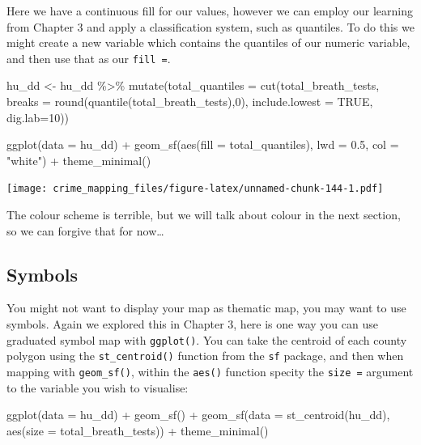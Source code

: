 \documentclass[
]{book}
\newenvironment{Shaded}{\begin{snugshade}}{\end{snugshade}}
\newcommand{\AttributeTok}[1]{\textcolor[rgb]{0.77,0.63,0.00}{#1}}
\newcommand{\ConstantTok}[1]{\textcolor[rgb]{0.00,0.00,0.00}{#1}}
\newcommand{\DecValTok}[1]{\textcolor[rgb]{0.00,0.00,0.81}{#1}}
\newcommand{\FloatTok}[1]{\textcolor[rgb]{0.00,0.00,0.81}{#1}}
\newcommand{\FunctionTok}[1]{\textcolor[rgb]{0.00,0.00,0.00}{#1}}
\newcommand{\NormalTok}[1]{#1}
\newcommand{\OtherTok}[1]{\textcolor[rgb]{0.56,0.35,0.01}{#1}}
\newcommand{\SpecialCharTok}[1]{\textcolor[rgb]{0.00,0.00,0.00}{#1}}
\newcommand{\StringTok}[1]{\textcolor[rgb]{0.31,0.60,0.02}{#1}}
\begin{document}
Here we have a continuous fill for our values, however we can employ our learning from Chapter 3 and apply a classification system, such as quantiles. To do this we might create a new variable which contains the quantiles of our numeric variable, and then use that as our \texttt{fill\ =}.

\begin{Shaded}
\begin{Highlighting}[]
\NormalTok{hu\_dd }\OtherTok{\textless{}{-}}\NormalTok{ hu\_dd }\SpecialCharTok{\%\textgreater{}\%} 
  \FunctionTok{mutate}\NormalTok{(}\AttributeTok{total\_quantiles =} \FunctionTok{cut}\NormalTok{(total\_breath\_tests, }\AttributeTok{breaks =} \FunctionTok{round}\NormalTok{(}\FunctionTok{quantile}\NormalTok{(total\_breath\_tests),}\DecValTok{0}\NormalTok{), }\AttributeTok{include.lowest =} \ConstantTok{TRUE}\NormalTok{, }\AttributeTok{dig.lab=}\DecValTok{10}\NormalTok{))}


\FunctionTok{ggplot}\NormalTok{(}\AttributeTok{data =}\NormalTok{ hu\_dd) }\SpecialCharTok{+} 
  \FunctionTok{geom\_sf}\NormalTok{(}\FunctionTok{aes}\NormalTok{(}\AttributeTok{fill =}\NormalTok{ total\_quantiles), }\AttributeTok{lwd =} \FloatTok{0.5}\NormalTok{, }\AttributeTok{col =} \StringTok{"white"}\NormalTok{) }\SpecialCharTok{+} 
  \FunctionTok{theme\_minimal}\NormalTok{()}
\end{Highlighting}
\end{Shaded}

\texttt{[image: crime\_mapping\_files/figure-latex/unnamed-chunk-144-1.pdf]}

The colour scheme is terrible, but we will talk about colour in the next section, so we can forgive that for now\ldots{}

\hypertarget{symbols}{%
\subsection{Symbols}\label{symbols}}

You might not want to display your map as thematic map, you may want to use symbols. Again we explored this in Chapter 3, here is one way you can use graduated symbol map with \texttt{ggplot()}. You can take the centroid of each county polygon using the \texttt{st\_centroid()} function from the \texttt{sf} package, and then when mapping with \texttt{geom\_sf()}, within the \texttt{aes()} function specity the \texttt{size\ =} argument to the variable you wish to visualise:

\begin{Shaded}
\begin{Highlighting}[]
\FunctionTok{ggplot}\NormalTok{(}\AttributeTok{data =}\NormalTok{ hu\_dd) }\SpecialCharTok{+} 
  \FunctionTok{geom\_sf}\NormalTok{() }\SpecialCharTok{+} 
  \FunctionTok{geom\_sf}\NormalTok{(}\AttributeTok{data =} \FunctionTok{st\_centroid}\NormalTok{(hu\_dd), }\FunctionTok{aes}\NormalTok{(}\AttributeTok{size =}\NormalTok{ total\_breath\_tests)) }\SpecialCharTok{+} 
  \FunctionTok{theme\_minimal}\NormalTok{()}
\end{Highlighting}
\end{Shaded}
\end{document}
